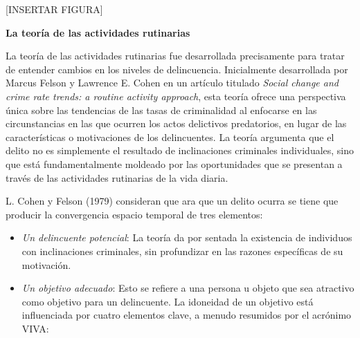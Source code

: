 \documentclass[
  spanish,
  letterpaper,
  DIV=11,
  numbers=noendperiod]{scrreprt}
\begin{document}
{[}INSERTAR FIGURA{]}

\begin{tcolorbox}[enhanced jigsaw, bottomtitle=1mm, toprule=.15mm, colbacktitle=quarto-callout-note-color!10!white, bottomrule=.15mm, leftrule=.75mm, colframe=quarto-callout-note-color-frame, opacitybacktitle=0.6, titlerule=0mm, breakable, colback=white, left=2mm, arc=.35mm, title=\textcolor{quarto-callout-note-color}{\faInfo}\hspace{0.5em}{Nota}, toptitle=1mm, coltitle=black, rightrule=.15mm, opacityback=0]

\textbf{La teoría de las actividades rutinarias}

La teoría de las actividades rutinarias fue desarrollada precisamente
para tratar de entender cambios en los niveles de delincuencia.
Inicialmente desarrollada por Marcus Felson y Lawrence E. Cohen en un
artículo titulado \emph{Social change and crime rate trends: a routine
activity approach}, esta teoría ofrece una perspectiva única sobre las
tendencias de las tasas de criminalidad al enfocarse en las
circunstancias en las que ocurren los actos delictivos predatorios, en
lugar de las características o motivaciones de los delincuentes. La
teoría argumenta que el delito no es simplemente el resultado de
inclinaciones criminales individuales, sino que está fundamentalmente
moldeado por las oportunidades que se presentan a través de las
actividades rutinarias de la vida diaria.

L. Cohen y Felson (1979) consideran que ara que un delito ocurra se
tiene que producir la convergencia espacio temporal de tres elementos:

\begin{itemize}
\item
  \emph{Un delincuente potencial}: La teoría da por sentada la
  existencia de individuos con inclinaciones criminales, sin profundizar
  en las razones específicas de su motivación.
\item
  \emph{Un objetivo adecuado}: Esto se refiere a una persona u objeto
  que sea atractivo como objetivo para un delincuente. La idoneidad de
  un objetivo está influenciada por cuatro elementos clave, a menudo
  resumidos por el acrónimo VIVA:


\end{itemize}
\end{tcolorbox}
\end{document}
